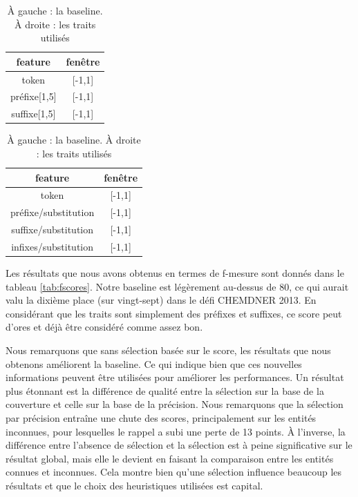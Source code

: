 \documentclass[12pt,a4paper,times,twoside,openright]{report}
\begin{document}
\begin{table}[ht!]
\begin{minipage}{0.45\linewidth}
\hfill
\begin{tabular}{|c|c|}
\hline
feature      & fenêtre \\
\hline
token        & [-1,1] \\
préfixe[1,5] & [-1,1] \\
suffixe[1,5] & [-1,1] \\
\hline
\end{tabular}
\end{minipage}
\begin{minipage}{0.9\linewidth}
\end{minipage}
\begin{minipage}{0.45\linewidth}
\begin{tabular}{|c|c|}
\hline
feature              & fenêtre \\
\hline
token                & [-1,1] \\
préfixe/substitution & [-1,1] \\
suffixe/substitution & [-1,1] \\
infixes/substitution & [-1,1] \\
\hline
\end{tabular}
\end{minipage}
\caption{À gauche : la baseline. À droite : les traits utilisés}
\label{tab:feature-sets}
\end{table}

Les résultats que nous avons obtenus en termes de f-mesure sont donnés dans le tableau \ref{tab:fscores}. Notre baseline est légèrement au-dessus de 80, ce qui aurait valu la dixième place (sur vingt-sept) dans le défi CHEMDNER 2013. En considérant que les traits sont simplement des préfixes et suffixes, ce score peut d'ores et déjà être considéré comme assez bon.

Nous remarquons que sans sélection basée sur le score, les résultats que nous obtenons améliorent la baseline. Ce qui indique bien que ces nouvelles informations peuvent être utilisées pour améliorer les performances. Un résultat plus étonnant est la différence de qualité entre la sélection sur la base de la couverture et celle sur la base de la précision. Nous remarquons que la sélection par précision entraîne une chute des scores, principalement sur les entités inconnues, pour lesquelles le rappel a subi une perte de 13 points. À l'inverse, la différence entre l'absence de sélection et la sélection est à peine significative sur le résultat global, mais elle le devient en faisant la comparaison entre les entités connues et inconnues. Cela montre bien qu'une sélection influence beaucoup les résultats et que le choix des heuristiques utilisées est capital.
\end{document}
